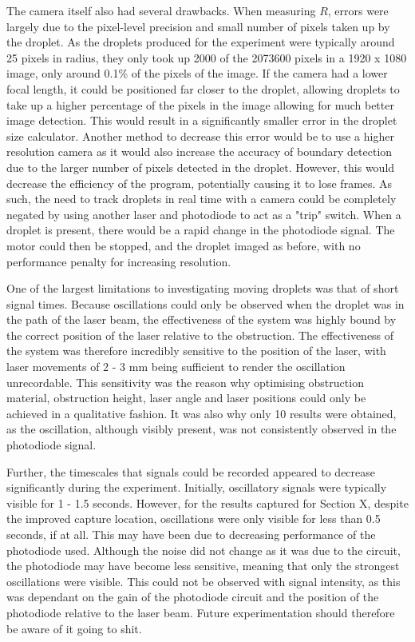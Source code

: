 \documentclass{physics_article_B}
\begin{document}
    The camera itself also had several drawbacks. When measuring $R$, errors were largely due to the pixel-level precision and small number of pixels taken up by the droplet. As the droplets produced for the experiment were typically around 25 pixels in radius, they only took up 2000 of the 2073600 pixels in a 1920 x 1080 image, only around 0.1\% of the pixels of the image. If the camera had a lower focal length, it could be positioned far closer to the droplet, allowing droplets to take up a higher percentage of the pixels in the image allowing for much better image detection. This would result in a significantly smaller error in the droplet size calculator. Another method to decrease this error would be to use a higher resolution camera as it would also increase the accuracy of boundary detection due to the larger number of pixels detected in the droplet. However, this would decrease the efficiency of the program, potentially causing it to lose frames. As such, the need to track droplets in real time with a camera could be completely negated by using another laser and photodiode to act as a "trip" switch. When a droplet is present, there would be a rapid change in the photodiode signal. The motor could then be stopped, and the droplet imaged as before, with no performance penalty for increasing resolution.
    
    One of the largest limitations to investigating moving droplets was that of short signal times. Because oscillations could only be observed when the droplet was in the path of the laser beam, the effectiveness of the system was highly bound by the correct position of the laser relative to the obstruction. The effectiveness of the system was therefore incredibly sensitive to the position of the laser, with laser movements of 2 - 3 mm being sufficient to render the oscillation unrecordable. This sensitivity was the reason why optimising obstruction material, obstruction height, laser angle and laser positions could only be achieved in a qualitative fashion. It was also why only 10 results were obtained, as the oscillation, although visibly present, was not consistently observed in the photodiode signal.
    
    Further, the timescales that signals could be recorded appeared to decrease significantly during the experiment. Initially, oscillatory signals were typically visible for 1 - 1.5 seconds. However, for the results captured for Section X, despite the improved capture location, oscillations were only visible for less than 0.5 seconds, if at all. This may have been due to decreasing performance of the photodiode used. Although the noise did not change as it was due to the circuit, the photodiode may have become less sensitive, meaning that only the strongest oscillations were visible. This could not be observed with signal intensity, as this was dependant on the gain of the photodiode circuit and the position of the photodiode relative to the laser beam. Future experimentation should therefore be aware of it going to shit.  
    
\end{document}
